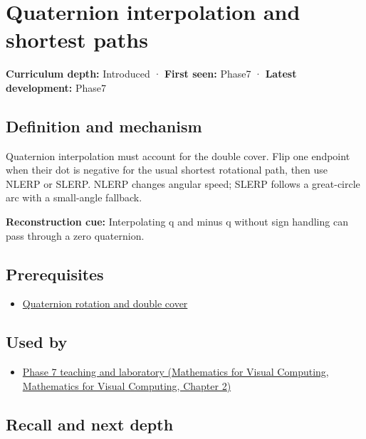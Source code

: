 \hypertarget{appendix-9b4b8254f26b}{}\label{referencestart:appendix-9b4b8254f26b}
\section{Quaternion interpolation and shortest paths}\label{appendix-9b4b8254f26b-quaternion-interpolation-and-shortest-paths}

\textbf{Curriculum depth:} Introduced · \textbf{First seen:} Phase7 · \textbf{Latest development:} Phase7

\subsection{Definition and mechanism}\label{appendix-9b4b8254f26b-definition-and-mechanism}

Quaternion interpolation must account for the double cover. Flip one endpoint when their dot is negative for the usual shortest rotational path, then use NLERP or SLERP. NLERP changes angular speed; SLERP follows a great-circle arc with a small-angle fallback.

\textbf{Reconstruction cue:} Interpolating q and minus q without sign handling can pass through a zero quaternion.

\subsection{Prerequisites}\label{appendix-9b4b8254f26b-prerequisites}

\begin{itemize}
\tightlist
\item
  \hyperref[appendix-8e61ab68f6b2]{Quaternion rotation and double cover}
\end{itemize}

\subsection{Used by}\label{appendix-9b4b8254f26b-used-by}

\begin{itemize}
\tightlist
\item
  \href{../02-Mathematics-for-Visual-Computing/main.pdf\#nameddest=01-foundations-i-ch018-keep-the-promises-visible-while-moving-between-representations}{Phase 7 teaching and laboratory (Mathematics for Visual Computing, Mathematics for Visual Computing, Chapter 2)}
\end{itemize}

\subsection{Recall and next depth}\label{appendix-9b4b8254f26b-recall-and-next-depth}


